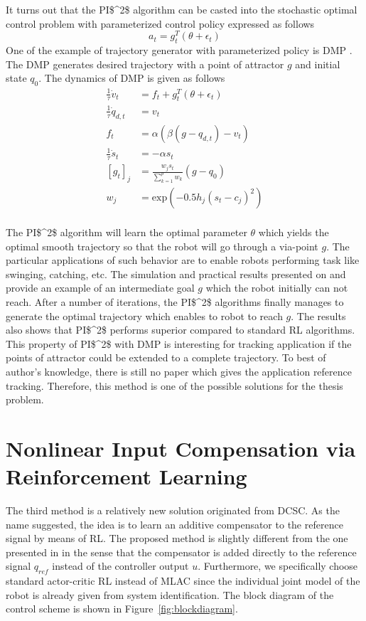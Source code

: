It turns out that the \ac{PI$^2$} algorithm can be casted into the stochastic optimal control problem with parameterized control policy expressed as follows
\begin{equation}
a_t = g_t^T(\theta+\epsilon_t)
\end{equation}
One of the example of trajectory generator with parameterized policy is \ac {DMP} \cite{ijspeert2002learning}. The \ac{DMP} generates desired trajectory with a point of attractor $g$ and initial state $q_0$. The dynamics of \ac {DMP} is given as follows
\begin{align}
\frac{1}{\tau} \dot{v}_t &= f_t + g^T_t(\theta+\epsilon_t) \\
\frac{1}{\tau} \dot{q}_{d,t} &= v_t \\
f_t &= \alpha(\beta(g-q_{d,t})-v_t)\\
\frac{1}{\tau}\dot{s}_t &= -\alpha s_t\\
[g_t]_j &= \frac{w_js_t}{\sum_{k=1}^{p}w_k}(g-q_0)\\
w_j &= \text{exp}(-0.5h_j(s_t-c_j)^2)\\
\end{align}

The \ac{PI$^2$} algorithm will learn the optimal parameter $\theta$ which yields the optimal smooth trajectory so that the robot will go through a via-point $g$. The particular applications of such behavior are to enable robots performing task like swinging, catching, etc. The simulation and practical results presented on \cite{Buchli2010} and \cite{Buchli6037312} provide an example of an intermediate goal $g$ which the robot initially can not reach. After a number of iterations, the \ac{PI$^2$} algorithms finally manages to generate the optimal trajectory which enables to robot to reach $g$. The results also shows that \ac{PI$^2$} performs superior compared to standard \ac {RL} algorithms. This property of \ac{PI$^2$} with \ac {DMP} is interesting for tracking application if the points of attractor could be extended to a complete trajectory. To best of author's knowledge, there is still no paper which gives the application reference tracking. Therefore, this method is one of the possible solutions for the thesis problem.

\section{Nonlinear Input Compensation via Reinforcement Learning} \label{sec:nl_comp}
The third method is a relatively new solution originated from \ac {DCSC}. As the name suggested, the idea is to learn an additive compensator to the reference signal by means of \ac{RL}. The proposed method is slightly different from the one presented in \cite{Efe2014} in the sense that the compensator is added directly to the reference signal $q_{ref}$ instead of the controller output $ u $. Furthermore, we specifically choose standard actor-critic \ac{RL} instead of \ac{MLAC} since the individual joint model of the robot is already given from system identification. The block diagram of the control scheme is shown in Figure~\ref{fig:blockdiagram}. 


